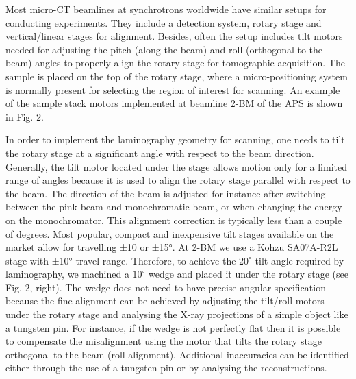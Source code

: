 \documentclass{article}
\begin{document}
Most micro-CT beamlines at synchrotrons worldwide have similar setups for conducting experiments. They include a detection system, rotary stage and vertical/linear stages for alignment. Besides, often the setup includes tilt motors needed for adjusting the pitch (along the beam) and roll (orthogonal to the beam) angles to properly align the rotary stage for tomographic acquisition. The sample is placed on the top of the rotary stage, where a micro-positioning system is normally present for selecting the region of interest for scanning. An example of the sample stack motors implemented at beamline 2-BM of the APS is shown in Fig. 2.

In order to implement the laminography geometry for scanning, one needs to tilt the rotary stage at a significant angle with respect to the beam direction. Generally, the tilt motor located under the stage allows motion only for a limited range of angles because it is used to align the rotary stage parallel with respect to the beam. The direction of the beam is adjusted for instance after switching between the pink beam and monochromatic beam, or when changing the energy on the monochromator. This alignment correction is typically less than a couple of degrees. Most popular, compact and inexpensive tilt stages available on the market allow for travelling ±10 or ±15°. At 2-BM we use a Kohzu SA07A-R2L stage with ±10° travel range. Therefore, to achieve the $20^\circ$ tilt angle required by laminography, we machined a $10^\circ$ wedge and placed it under the rotary stage (see Fig. 2, right). The wedge does not need to have precise angular specification because the fine alignment can be achieved by adjusting the tilt/roll motors under the rotary stage and analysing the X-ray projections of a simple object like a tungsten pin. For instance, if the wedge is not perfectly flat then it is possible to compensate the misalignment using the motor that tilts the rotary stage orthogonal to the beam (roll alignment). Additional inaccuracies can be identified either through the use of a tungsten pin or by analysing the reconstructions.
\end{document}
